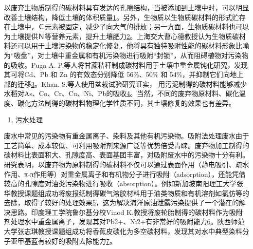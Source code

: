 \documentclass[
]{book}
\providecommand{\tightlist}{%
  \setlength{\itemsep}{0pt}\setlength{\parskip}{0pt}}
\begin{document}
以废弃生物质制得的碳材料具有发达的孔隙结构，当被添加到土壤中时，可以明显改善土壤结构，降低土壤的体积质量\href{陈心想，耿增超。西北农林科技大学学报（自然科学版），2013，41:\%20167-174．}{1}。另外，生物质以生物质碳材料的形式贮存在土壤中，Ｃ元素被固定，减少了向大气的排放；另一方面，生物质碳材料也可以为土壤提供Ｎ等营养元素，提升土壤肥力\href{Kezhen\%20Qian,\%20Ajay\%20Kumar,\%20et.al.\%20Renew.\%20and\%20Sustain.\%20Energy\%20Reviews,\%202015,\%2042:\%201055-1064.}{2}。上海交大曹心德教授认为生物质碳材料还可以用于土壤污染物的稳定化修复，他将具有独特吸附性能的碳材料形象比喻为``吸盘''，对土壤中重金属和有机污染物进行吸附``封锁''，从而阻碍植物对污染物的吸收。Puga A. P.等人将甘蔗秸秆制成碳材料用于土壤中重金属钝化研究，发现其可将Cd、Pb 和 Zn 的有效态分别降低 56\%、50\% 和 54\%，并抑制它们向地上部的迁移\href{Puga\%20A\%20P,\%20Abreu\%20C\%20A,\%20et\%20al.\%20J.\%20of\%20Environ.\%20Manage.,\%202015,\%20159:\%2086–93.}{3}。Khan. S.等人使用盆栽试验研究证实， 用污泥制得的碳材料能够减少水稻对As、Co、Cr、Cu、Ni、Pb的吸收\href{Khan\%20S,\%20Cai\%20Chao,\%20et\%20al．\%20Environ.\%20Sci.\%20\&\%20Technol.,\%202013,\%2047\%20:\%208624-8632．}{4}。当然，不同的废弃物原材料、碳化温度、碳化方法制得的碳材料物理化学性质不同，其土壤修复的效果也有差异。

\begin{enumerate}
\def\labelenumi{\arabic{enumi}.}
\setcounter{enumi}{1}
\tightlist
\item
  污水处理
\end{enumerate}

废水中常见的污染物有重金属离子、染料及其他有机污染物。吸附法处理废水由于工艺简单、成本较低、可利用吸附剂来源广泛等优势倍受青睐。废弃物加工制得的碳材料比表面积大、孔隙度高、表面基团丰富，对吸附废水中的污染物十分有利。研究表明，以废弃物为原料制得的碳材料不仅可以通过表面作用（静电吸引、疏水作用、π-π作用等）对重金属离子和有机物分子进行吸附（adsorption），还能凭借较高的孔隙度对油类污染物进行吸收（absorption）。例如新加坡南阳理工大学张华教授课题组成功将废报纸制得碳气溶胶材料用于油类物质和有机溶剂如氯仿等的去除，取得了较好的处理效果\href{Bi\%20H,\%20Huang\%20X,\%20et\%20al.\%20Small\%202014,\%2010,\%203544.}{5}，这为解决海洋原油泄露污染提供了一个潜在的解决思路。印度理工学院鲁尔基分校Vinod K.教授将废轮胎制得的碳材料作为吸附剂处理水中重金属离子，发现其对Pb2+、Ni2+有非常好的吸附能力\href{Gupta\%20V\%20K,\%20Ganjali\%20M\%20R,\%20et\%20al.\%20Chemical\%20Engineering\%20Journal,\%202012,\%20197:\%20330.}{6}。陕西师范大学张志琪教授课题组成功将香蕉皮碳化为多空碳材料，发现其对水中典型染料分子亚甲基蓝有较好的吸附去除能力\href{Liu\%20R\%20L,\%20Liu\%20Y,\%20et\%20al.\%20Bioresourse\%20Technology\%202014,\%20154:\%20138.}{7}。
\end{document}
